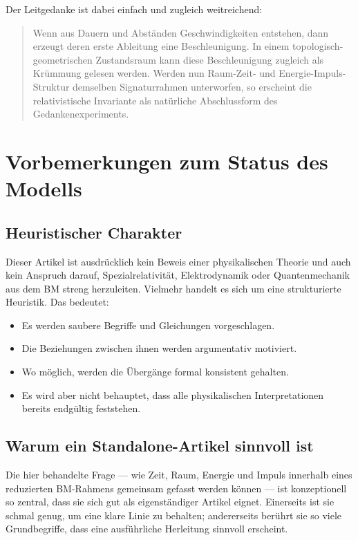 \documentclass[11pt,a4paper]{article}
\theoremstyle{definition}
\theoremstyle{plain}
\begin{document}
	Der Leitgedanke ist dabei einfach und zugleich weitreichend:
	\begin{quote}
		Wenn aus Dauern und Abständen Geschwindigkeiten entstehen, dann erzeugt deren erste Ableitung eine Beschleunigung. In einem topologisch-geometrischen Zustandsraum kann diese Beschleunigung zugleich als Krümmung gelesen werden. Werden nun Raum-Zeit- und Energie-Impuls-Struktur demselben Signaturrahmen unterworfen, so erscheint die relativistische Invariante als natürliche Abschlussform des Gedankenexperiments.
	\end{quote}
	
	\section{Vorbemerkungen zum Status des Modells}
	
	\subsection{Heuristischer Charakter}
	
	Dieser Artikel ist ausdrücklich kein Beweis einer physikalischen Theorie und auch kein Anspruch darauf, Spezialrelativität, Elektrodynamik oder Quantenmechanik aus dem BM streng herzuleiten. Vielmehr handelt es sich um eine strukturierte Heuristik. Das bedeutet:
	\begin{itemize}[leftmargin=2em]
		\item Es werden saubere Begriffe und Gleichungen vorgeschlagen.
		\item Die Beziehungen zwischen ihnen werden argumentativ motiviert.
		\item Wo möglich, werden die Übergänge formal konsistent gehalten.
		\item Es wird aber nicht behauptet, dass alle physikalischen Interpretationen bereits endgültig feststehen.
	\end{itemize}
	
	\subsection{Warum ein Standalone-Artikel sinnvoll ist}
	
	Die hier behandelte Frage --- wie Zeit, Raum, Energie und Impuls innerhalb eines reduzierten BM-Rahmens gemeinsam gefasst werden können --- ist konzeptionell so zentral, dass sie sich gut als eigenständiger Artikel eignet. Einerseits ist sie schmal genug, um eine klare Linie zu behalten; andererseits berührt sie so viele Grundbegriffe, dass eine ausführliche Herleitung sinnvoll erscheint.
	
\end{document}
